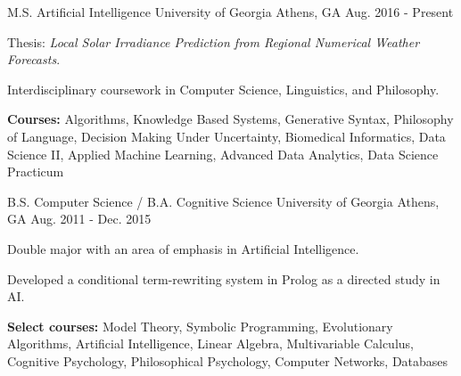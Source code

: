 \begin{cventries}

\cventry
{M.S. Artificial Intelligence}
{University of Georgia}
{Athens, GA}
{Aug. 2016 - Present}
{\begin{cvitems}
    \item {Thesis: \textit{Local Solar Irradiance Prediction from Regional Numerical Weather Forecasts}.}
    \item {Interdisciplinary coursework in Computer Science, Linguistics, and Philosophy.}
    \item {\textbf{Courses:} Algorithms, Knowledge Based Systems, Generative Syntax, Philosophy of Language, Decision Making Under Uncertainty, Biomedical Informatics, Data Science II, Applied Machine Learning, Advanced Data Analytics, Data Science Practicum}
\end{cvitems}}

\cventry
{B.S. Computer Science / B.A. Cognitive Science}
{University of Georgia}
{Athens, GA}
{Aug. 2011 - Dec. 2015}
{\begin{cvitems}
    \item {Double major with an area of emphasis in Artificial Intelligence.}
    \item {Developed a conditional term-rewriting system in Prolog as a directed study in AI.}
    \item {\textbf{Select courses:} Model Theory, Symbolic Programming, Evolutionary Algorithms, Artificial Intelligence, Linear Algebra, Multivariable Calculus, Cognitive Psychology, Philosophical Psychology, Computer Networks, Databases}
\end{cvitems}}

\end{cventries}
